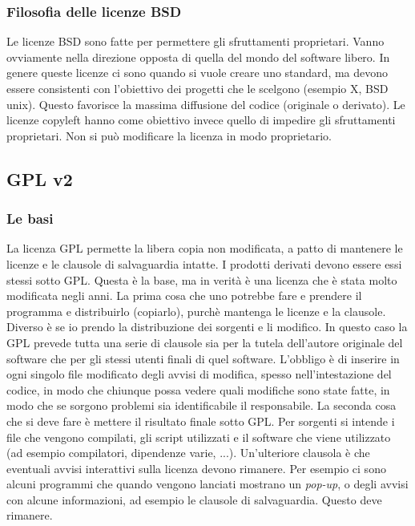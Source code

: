 \subsubsection{Filosofia delle licenze BSD}

Le licenze BSD sono fatte per permettere gli sfruttamenti proprietari. Vanno ovviamente nella direzione opposta di quella del mondo del software libero. In genere queste licenze ci sono quando si vuole creare uno standard, ma devono essere consistenti con l'obiettivo dei progetti che le scelgono (esempio X, BSD unix). Questo favorisce la massima diffusione del codice (originale o derivato). Le licenze copyleft hanno come obiettivo invece quello di impedire gli sfruttamenti proprietari. Non si può modificare la licenza in modo proprietario. 

\subsection{GPL v2}

\subsubsection{Le basi}

La licenza GPL permette la libera copia non modificata, a patto di mantenere le licenze e le clausole di salvaguardia intatte. I prodotti derivati devono essere essi stessi sotto GPL. Questa è la base, ma in verità è una licenza che è stata molto modificata negli anni. La prima cosa che uno potrebbe fare e prendere il programma e distribuirlo (copiarlo), purchè mantenga le licenze e la clausole. Diverso è se io prendo la distribuzione dei sorgenti e li modifico. In questo caso la GPL prevede tutta una serie di clausole sia per la tutela dell'autore originale del software che per gli stessi utenti finali di quel software. L'obbligo è di inserire in ogni singolo file modificato degli avvisi di modifica, spesso nell'intestazione del codice, in modo che chiunque possa vedere quali modifiche sono state fatte, in modo che se sorgono problemi sia identificabile il responsabile. La seconda cosa che si deve fare è mettere il risultato finale sotto GPL. Per sorgenti si intende i file che vengono compilati, gli script utilizzati e il software che viene utilizzato (ad esempio compilatori, dipendenze varie, ...). Un'ulteriore clausola è che eventuali avvisi interattivi sulla licenza devono rimanere. Per esempio ci sono alcuni programmi che quando vengono lanciati mostrano un \textit{pop-up}, o degli avvisi con alcune informazioni, ad esempio le clausole di salvaguardia. Questo deve rimanere. 

